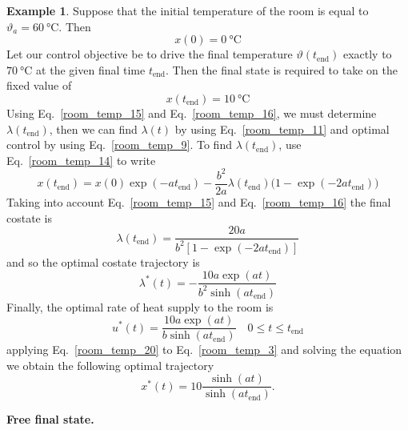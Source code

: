 \documentclass[11pt,a4paper,oneside]{book}
\numberwithin{equation}{section}
\theoremstyle{it}
\theoremstyle{definition}
\newtheorem{example}{Example}[chapter]
\begin{document}
\begin{example}
	Suppose that the initial temperature of the room is equal to 
	$\vartheta_a=\SI{60}{\celsius}$. Then
	\begin{equation}\label{room_temp_15}
		x(0)=\SI{0}{\celsius}
	\end{equation}
	Let our control objective be to drive the final temperature 
	$\vartheta(t_\text{end})$ 
	exactly to $\SI{70}{\celsius}$ at the given final time $t_\text{end}$. Then 
	the final 
	state is required to take on the fixed value of 
	\begin{equation}\label{room_temp_16}
		x(t_\text{end})=\SI{10}{\celsius}
	\end{equation}
	Using Eq.~\eqref{room_temp_15} and Eq.~\eqref{room_temp_16}, we must 
	determine $\lambda(t_\text{end})$, then we can find $\lambda(t)$ by using 
	Eq.~\eqref{room_temp_11} and optimal control by using 
	Eq.~\eqref{room_temp_9}. To find $\lambda(t_\text{end})$, use 
	Eq.~\eqref{room_temp_14} 
	to write
	\begin{equation}\label{room_temp_17}
		x(t_\text{end})=x(0)\exp(-at_\text{end})-\frac{b^2}{2a} 
		\lambda(t_\text{end})\Big(1-\exp(-2at_\text{end})\Big)
	\end{equation}
	Taking into account Eq.~\eqref{room_temp_15} and Eq.~\eqref{room_temp_16} 
	the final costate is 
	\begin{equation}\label{room_temp_18}
		\lambda(t_\text{end}) = \frac{20a}{b^2[1-\exp(-2at_\text{end})]}
	\end{equation}
	and so the optimal costate trajectory is
	\begin{equation}\label{room_temp_19}
		\lambda^*(t) = -\frac{10a\exp(at)}{b^2\sinh(at_\text{end})}
	\end{equation}
	Finally, the optimal rate of heat supply to the room is
	\begin{equation}\label{room_temp_20}
		u^*(t) = \frac{10a\exp(at)}{b\sinh(at_\text{end})}\quad 0 \le t \le t_\text{end}
	\end{equation}
	applying Eq.~\eqref{room_temp_20} to Eq.~\eqref{room_temp_3} and solving 
	the equation we obtain the following optimal trajectory
	\begin{equation}\label{room_temp_21}
		x^*(t) = 10\frac{\sinh(at)}{\sinh(at_\text{end})}.
	\end{equation}
	
	\noindent\textbf{Free final state.}
	

\end{example}
\end{document}
